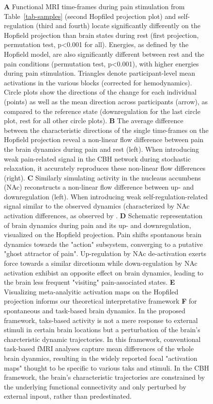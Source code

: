 \documentclass{article}
\begin{document}
\begin{figure}[!htbp]
{\textbf{A} Functional MRI time-frames during pain stimulation from Table~\ref{tab-samples} (second Hopfiled projection plot)
and self-regulation (third and fourth) locate significantly differently on the Hopfield projection than brain states
during rest (first projection, permutation test, p\textless 0.001 for all). Energies, as defined by the Hopfield model, are also
significantly different between rest and the pain conditions (permutation test, p\textless 0.001), with higher energies during
pain stimulation. Triangles denote participant-level mean activations in the various blocks (corrected for
hemodynamics). Circle plots show the directions of the change for each individual (points) as well as the mean direction
across participants (arrow), as compared to the reference state (downregulation for the last circle plot, rest for all
other circle plots).
\textbf{B} The average difference between the characteristic directions of the single time-frames on the Hopfield projection
reveal a non-linear flow difference between pain the brain dynamics during pain and rest (left). When introducing weak
pain-related signal in the CBH network during stochastic relaxation, it accurately reproduces these non-linear flow
differences (right).
\textbf{C} Similarly simulating activity in the nucleaus accumbens (NAc) reconstructs a non-linear flow difference between
up- and downregulation (left). When introducing weak self-regulation-related signal similar to the observed dynamics
(characterized by NAc activation differences, as observed by \citep{woo2015distinct}.
\textbf{D} Schematic representation of brain dynamics during pain and its up- and downregulation, visualized on the Hopfield
projection. Pain shifts spontanous brain dynamics towards the "action" subsystem, converging to a putative "ghost
attractor of pain". Up-regulation by NAc de-activation exerts force towards a similar dircetionm while down-regulation
by NAc activation exhibist an opposite effect on brain dynamics, leading to the brain less frequent "visiting"
pain-associated states.
\textbf{E} Visualizing meta-analyitic activation maps on the Hopfiled projection informs our theoretical interpretative
framework
\textbf{F}  for spontaneous and task-based brain dynamics. In the proposed framework, taks-based activity is not a mere
response to external stimuli in certain brain locations but a perturbation of the brain's charcteristic dynamic
trajectories. In this framework, conventional task-based fMRI analyses capture mean differences of the whole brain
dyanmics, resulting in the widely reported focal "activation maps" thought to be specific to various taks and stimuli.
In the CBH framework, the brain's characteristic trajectories are constrained by the underlying functional connectivity
and only perturbed by external inpout, rather than predestinated.}
\label{task-validity}
\end{figure}
\end{document}

